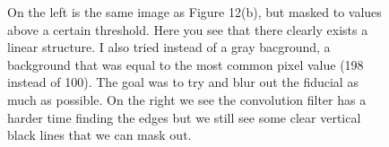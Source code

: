 \documentclass[10pt]{article}
\begin{document}
\begin{figure}[!ht]
    \centering
        \caption{On the left is the same image as Figure 12(b), but masked to values above a certain threshold. Here you see that there clearly exists a linear structure. I also tried instead of a gray bacground, a background that was equal to the most common pixel value (198 instead of 100). The goal was to try and blur out the fiducial as much as possible. On the right we see the convolution filter has a harder time finding the edges but we still see some clear vertical black lines that we can mask out.}
\end{figure}
\end{document}
